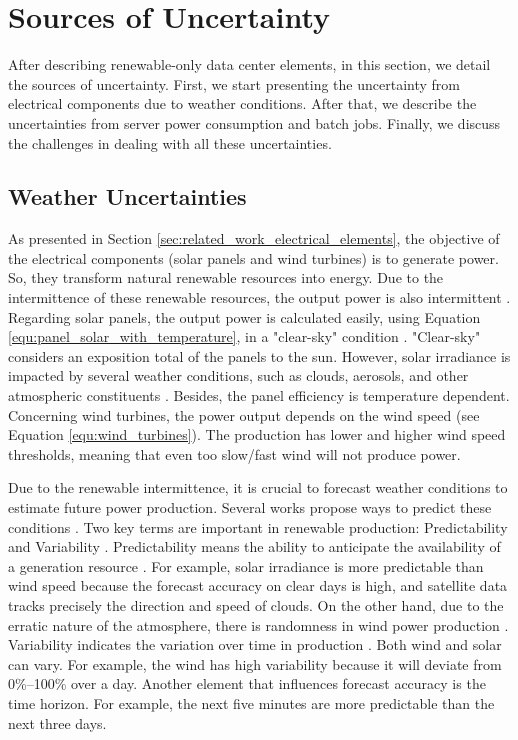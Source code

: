 \section{Sources of Uncertainty}

After describing renewable-only data center elements, in this section, we detail the sources of uncertainty. First, we start presenting the uncertainty from electrical components due to weather conditions. After that, we describe the uncertainties from server power consumption and batch jobs. Finally, we discuss the challenges in dealing with all these uncertainties.

\subsection{Weather Uncertainties}
\label{sec:weather_uncertainties}

As presented in Section \ref{sec:related_work_electrical_elements}, the objective of the electrical components (solar panels and wind turbines) is to generate power. So, they transform natural renewable resources into energy. Due to the intermittence of these renewable resources, the output power is also intermittent \cite{perez2011managing}. Regarding solar panels, the output power is calculated easily, using Equation \ref{equ:panel_solar_with_temperature}, in a "clear-sky" condition \cite{tuohy2015solar}. "Clear-sky" considers an exposition total of the panels to the sun. However, solar irradiance is impacted by several weather conditions, such as clouds, aerosols, and other atmospheric constituents \cite{tuohy2015solar}. Besides, the panel efficiency is temperature dependent. Concerning wind turbines, the power output depends on the wind speed (see Equation \ref{equ:wind_turbines}). The production has lower and higher wind speed thresholds, meaning that even too slow/fast wind will not produce power. 

Due to the renewable intermittence, it is crucial to forecast weather conditions to estimate future power production. Several works propose ways to predict these conditions \cite{tuohy2015solar, soman2010review, sharma2018review, ssekulima2016wind}. Two key terms are important in renewable production: Predictability and Variability \cite{ssekulima2016wind, perez2011managing}. Predictability means the ability to anticipate the availability of a generation resource \cite{perez2011managing}. For example, solar irradiance is more predictable than wind speed because the forecast accuracy on clear days is high, and satellite data tracks precisely the direction and speed of clouds. On the other hand, due to the erratic nature of the atmosphere, there is randomness in wind power production \cite{sharma2018review}. Variability indicates the variation over time in production \cite{perez2011managing}. Both wind and solar can vary. For example, the wind has high variability because it will deviate from 0\%–100\% over a day. Another element that influences forecast accuracy is the time horizon. For example, the next five minutes are more predictable than the next three days.

